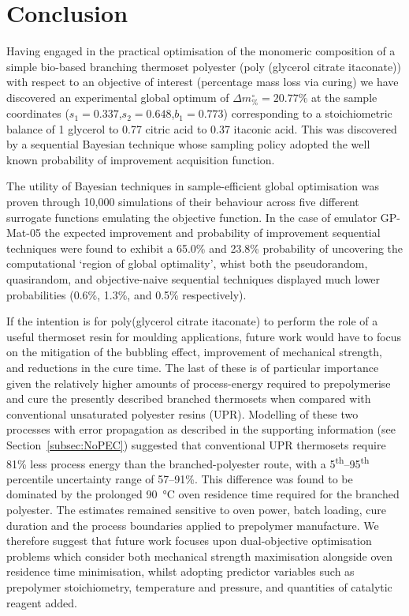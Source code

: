 \section{Conclusion}
Having engaged in the practical optimisation of the monomeric composition 
 of a simple bio-based branching thermoset polyester (poly (glycerol
 citrate itaconate)) with respect to an objective of interest
 (percentage mass loss via curing) we have discovered 
 an experimental global
 optimum of \(\Delta m_{\%}^{\circ}=20.77\%\) at the sample coordinates
 (\(s_{1}=0.337\),\(s_{2}=0.648\),\(b_{1}=0.773\)) corresponding to a
 stoichiometric balance of 1 glycerol to 0.77 citric acid to 0.37 itaconic
 acid.
This was discovered by a sequential Bayesian technique whose
 sampling policy adopted the well known probability of improvement
 acquisition function.

The utility of Bayesian techniques in sample-efficient global optimisation
 was proven through 10,000 simulations of their behaviour across five
 different surrogate functions emulating the objective function.
In the case of emulator GP-Mat-05 the expected improvement and probability
 of improvement sequential techniques were found to exhibit a
 65.0\% and 23.8\% probability of uncovering the computational 
 `region of global optimality', whist both the pseudorandom, quasirandom,
 and objective-naive sequential techniques displayed much lower 
 probabilities (0.6\%, 1.3\%, and 0.5\% respectively).

If the intention is for poly(glycerol citrate itaconate) to perform 
 the role of a useful thermoset resin for moulding applications, 
 future work would have to focus on the mitigation of the bubbling 
 effect, improvement of mechanical strength, and reductions in 
 the cure time.
The last of these is of particular importance given the relatively
 higher amounts of process-energy required to prepolymerise and
 cure the presently described branched thermosets when compared
 with conventional unsaturated polyester resins (UPR).
Modelling of these two processes with error propagation as 
 described in the supporting information (see 
 Section~\ref{subsec:NoPEC}) suggested that conventional UPR
 thermosets require 81\% less process energy than the 
 branched-polyester route, with a 
 5\textsuperscript{th}–95\textsuperscript{th} percentile 
 uncertainty range of 57–91\%.
This difference was found to be dominated by the prolonged 
 90~\unit{\degreeCelsius} oven residence time required for the 
 branched polyester.
The estimates remained sensitive to oven power, batch loading, cure
 duration and the process boundaries applied to prepolymer
 manufacture.
We therefore suggest that future work focuses upon 
 dual-objective optimisation problems which consider both mechanical 
 strength maximisation alongside oven residence time minimisation, 
 whilst adopting predictor variables such as prepolymer stoichiometry,
 temperature and pressure, and quantities of catalytic reagent
 added.


